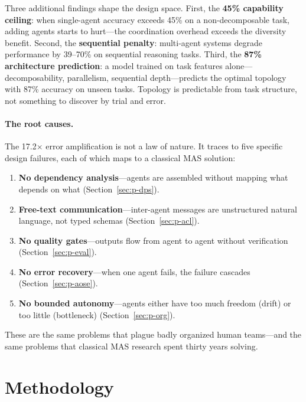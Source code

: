 \documentclass{article}
\begin{document}
\noindent
Three additional findings shape the design space. First, the \textbf{45\% capability
ceiling}: when single-agent accuracy exceeds 45\% on a non-decomposable task, adding
agents starts to hurt---the coordination overhead exceeds the diversity benefit. Second,
the \textbf{sequential penalty}: multi-agent systems degrade performance by 39--70\% on
sequential reasoning tasks. Third, the \textbf{87\% architecture prediction}: a model
trained on task features alone---decomposability, parallelism, sequential
depth---predicts the optimal topology with 87\% accuracy on unseen tasks. Topology is
predictable from task structure, not something to discover by trial and error.

\paragraph{The root causes.}
The 17.2$\times$ error amplification is not a law of nature. It traces to five specific
design failures, each of which maps to a classical MAS solution:
\begin{enumerate}[nosep]
  \item \textbf{No dependency analysis}---agents are assembled without mapping what
    depends on what (Section~\ref{sec:p-dps}).
  \item \textbf{Free-text communication}---inter-agent messages are unstructured natural
    language, not typed schemas (Section~\ref{sec:p-acl}).
  \item \textbf{No quality gates}---outputs flow from agent to agent without
    verification (Section~\ref{sec:p-eval}).
  \item \textbf{No error recovery}---when one agent fails, the failure cascades
    (Section~\ref{sec:p-aose}).
  \item \textbf{No bounded autonomy}---agents either have too much freedom (drift) or
    too little (bottleneck) (Section~\ref{sec:p-org}).
\end{enumerate}

\noindent
These are the same problems that plague badly organized human teams---and the same
problems that classical MAS research spent thirty years solving.


\section{Methodology}
\label{sec:methodology}
\end{document}
